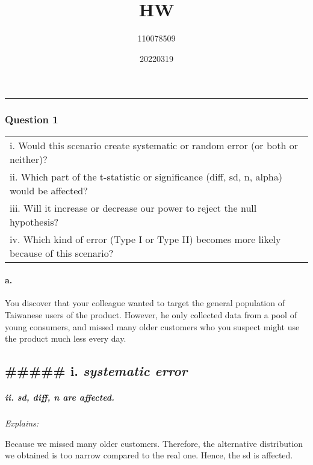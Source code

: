 \documentclass[
]{article}
\title{HW}
\author{110078509}
\date{20220319}
\begin{document}
\maketitle

\begin{center}\rule{0.5\linewidth}{0.5pt}\end{center}

\hypertarget{question-1}{%
\subsubsection{Question 1}\label{question-1}}

\begin{longtable}[]{@{}l@{}}
\toprule
\endhead
i. Would this scenario create systematic or random error (or both or
neither)? \\
ii. Which part of the t-statistic or significance (diff, sd, n, alpha)
would be affected? \\
iii. Will it increase or decrease our power to reject the null
hypothesis? \\
iv. Which kind of error (Type I or Type II) becomes more likely because
of this scenario? \\
\bottomrule
\end{longtable}

\hypertarget{a.}{%
\paragraph{a.}\label{a.}}

You discover that your colleague wanted to target the general population
of Taiwanese users of the product. However, he only collected data from
a pool of young consumers, and missed many older customers who you
suspect might use the product much less every day.

\hypertarget{i.-systematic-error}{%
\subsection{\texorpdfstring{\#\#\#\#\# i. \emph{systematic
error}}{\#\#\#\#\# i. systematic error}}\label{i.-systematic-error}}

\hypertarget{ii.-sd-diff-n-are-affected.}{%
\subparagraph{\texorpdfstring{ii. \emph{sd, diff, n are
affected.}}{ii. sd, diff, n are affected.}}\label{ii.-sd-diff-n-are-affected.}}

\emph{Explains:}

Because we missed many older customers. Therefore, the alternative
distribution we obtained is too narrow compared to the real one. Hence,
the sd is affected.
\end{document}
